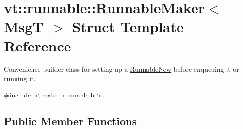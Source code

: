 \hypertarget{structvt_1_1runnable_1_1_runnable_maker}{}\section{vt\+:\+:runnable\+:\+:Runnable\+Maker$<$ MsgT $>$ Struct Template Reference}
\label{structvt_1_1runnable_1_1_runnable_maker}


Convenience builder class for setting up a {\ttfamily \hyperlink{structvt_1_1runnable_1_1_runnable_new}{Runnable\+New}} before enqueuing it or running it.  




{\ttfamily \#include $<$make\+\_\+runnable.\+h$>$}

\subsection*{Public Member Functions}

